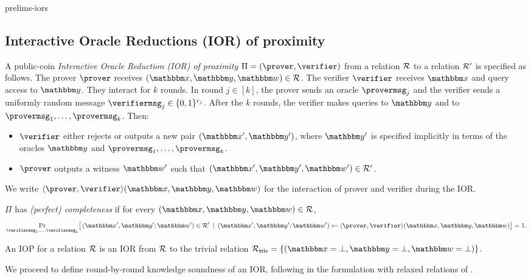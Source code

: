 \begin{lncsappendix}{prelims-iors}
\subsection{Interactive Oracle Reductions (IOR) of proximity}\label{s:IORs}


A public-coin \emph{Interactive Oracle Reduction (IOR) of proximity} $\Pi=(\prover,\verifier)$ from a relation $\mathcal{R}$ to a relation $\mathcal{R}'$ is specified as follows. The prover $\prover$ receives $(\inp, \oracle,\wit)\in \Relation$. The verifier $\verifier$ receives $\inp$ and query access to $\oracle$. They interact for $k$ rounds. In round $j\in[k]$, the prover sends an oracle $\provermsg_j$ and the verifier sends a uniformly random message $\verifiermsg_j\in\{0,1\}^{r_j}$. After the $k$ rounds, the verifier makes  queries to $\oracle$ and to $\provermsg_1,\ldots,\provermsg_k$. Then:
\begin{itemize}[nosep]
  \item $\verifier$ either rejects or outputs a new  pair $(\inp', \oracle')$, where $\oracle'$ is specified implicitly in terms of the oracles $\oracle$ and $\provermsg_1,\ldots,\provermsg_k$.
  \item $\prover$ outputs a witness $\wit'$ such that $(\inp', \oracle', \wit')\in \Relation'$.
\end{itemize}
We write $ \langle \prover, \verifier\rangle(\inp,\oracle,\wit)$ for the interaction of prover and verifier during the IOR.

\begin{definition}[Completeness]
\label{def:ior-completeness}
$\Pi$ has \emph{(perfect) completeness}  if for every $(\inp, \oracle,\wit)\in\Relation$,
\[
  \Pr_{\verifiermsg_1,\dots,\verifiermsg_k}\bigl[\,(\inp',\oracle';\wit')\in \Relation'\, \mid \, (\inp',\oracle';\wit') \gets \langle \prover, \verifier\rangle(\inp,\oracle,\wit)\bigr]=1.
\]
\end{definition}

\begin{remark}
    An IOP for a relation $\mathcal{R}$ is an IOR from $\mathcal{R}$ to the trivial relation $\Relation_{\mathsf{triv}}=\{(\inp=\bot,\oracle=\bot, \wit=\bot)\}$.
\end{remark}

We proceed to define round-by-round knowledge soundness of an IOR, following \cite{BCFW25} in the formulation with relaxed relations of \cite{zook}.




\end{lncsappendix}
